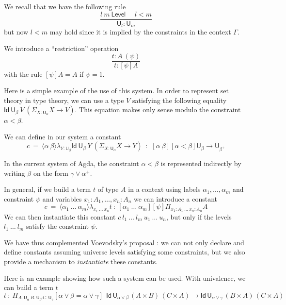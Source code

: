 \documentclass[11pt,a4paper]{article}
\theoremstyle{definition}
\newcommand{\Id}{\mathsf{Id}}
\newcommand{\lam}[2]{{\langle}#1{\rangle}#2}
\def\UU{\mathsf{U}}
\def\Level{\mathsf{Level}}
\begin{document}
We recall that we have the following rule
$$
\frac{l~m~\Level~~~~~~l<m}{\UU_l:\UU_m}
$$
but now $l<m$ may hold since it is implied by the constraints in the context $\Gamma$.

We introduce a ``restriction'' operation
$$
\frac{t:A~(\psi)}{t:[\psi]A}
$$
with the rule $[\psi]A = A$ if $\psi = 1$.

\medskip

Here is a simple example of the use of this system. In order to represent set theory in type
theory, we can use a type $V$ satisfying the following equality $\Id~{\UU_{\beta}}~V~(\Sigma_{X:\UU_{\alpha}}X\rightarrow V)$.
This equation makes only sense modulo the constraint $\alpha<\beta$.

We can define in our system a constant
$$
c~=~\lam{\alpha~\beta}\lambda_{Y:\UU_{\beta}}\Id~{\UU_{\beta}}~Y~ (\Sigma_{X:\UU_{\alpha}}X\rightarrow Y)~~:~~
   [\alpha~\beta][\alpha<\beta]\UU_{\beta} \rightarrow \UU_{\beta^+}
$$

In the current system of Agda, the constraint $\alpha<\beta$ is represented indirectly by
writing $\beta$ on the form $\gamma\vee \alpha^+$.

\medskip

In general, if we  build a term $t$ of type $A$ in a context using labels $\alpha_1,\dots,\alpha_m$
and constraint $\psi$ and variables $x_1:A_1,\dots,x_n:A_n$ we can introduce a constant
$$
c~=~ \lam{\alpha_1~\dots~\alpha_m}\lambda_{x_1~\dots~x_n}t ~:~
[\alpha_1~\dots~\alpha_m][\psi]\Pi_{x_1:A_1~\dots~x_n:A_n}A
$$
We can then instantiate this constant $c~l_1~\dots~l_m~u_1~\dots~u_n$, but only if the levels
$l_1~\dots~l_m$ satisfy the constraint $\psi$.

    We have thus complemented Voevodsky's proposal \cite{VV}: we can not only declare and define
    constants assuming universe levels satisfying some constraints, but we also provide a mechanism
    to {\em instantiate} these constants.

    

\medskip




Here is an example showing how such a system can be used. With univalence, we can build a term $t$
$$
t~:~    \Pi_{A:\UU_\alpha~{B}:{\UU_\beta}~{C}:{\UU_\gamma}}[\alpha \vee \beta = \alpha \vee \gamma]
    {~~\Id\,\UU_{\alpha \vee \beta}\, (A\times B)\,(C \times A)
    \to \Id\,\UU_{\alpha \vee \gamma}\, (B\times A)\,(C \times A)}
$$
\end{document}
